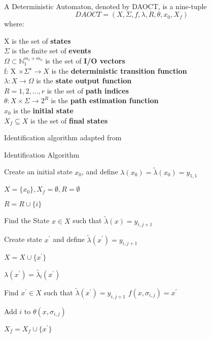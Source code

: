 \begin{definition}
  \label{def:daoct}~\\
  A Deterministic Automaton, denoted by DAOCT, is a nine-tuple
  \[ DAOCT = (X,\Sigma,f,\lambda,R,\theta, x_0,X_f)\] where:

  \indent X is the set of \textbf{states} \\
  \indent $\Sigma$ is the finite set of \textbf{events}\\
  \indent $\Omega \subset \mathbb{N}_1^{m_i+m_o} $ is the set of \textbf{I/O vectors}\\
  \indent f: X $\times \Sigma^\star \rightarrow X$ is the \textbf{deterministic transition function}  \\
  \indent $\lambda : X \rightarrow \Omega$ is the \textbf{state output function} \\
  \indent $R = {1,2,\dots,r}$ is the set of \textbf{path indices} \\
  \indent $\theta : X \times \Sigma \rightarrow 2^R$ is the \textbf{path
    estimation function} \\
  \indent $x_0$ is the \textbf{initial state} \\
  \indent $X_f \subseteq X $ is the set of \textbf{final states}
\end{definition}

Identification algorithm adapted from \cite{moreira2018enhanced}
\begin{algorithm2e}
  \caption{Identification Algorithm}\label{alg:identification}
    \BlankLine Create an initial state $x_0$, and define $\lambda(x_0) =
  \tilde{\lambda}(x_0) = y_{1,1}$

  $X = \{ x_0\}, X_f = \emptyset, R = \emptyset$

   { $R = R \cup \{ i \}$
  
     { Find the State $x \in X $ such that
      $\tilde{\lambda}(x) = y_{i,j+1}$

       { Create
        state $x^\prime$ and define $\tilde{\lambda}(x^\prime) = y_{i,j+1}$

        $X = X \cup \{ x^\prime\}$

        $\lambda(x^\prime) = \tilde{\lambda_l}(x^\prime)$

      } { Find $x^\prime \in X$ such that $\tilde{\lambda}(x^\prime) =
        y_{i,j+1}$ } $f(x,\sigma_{i,j}) = x^\prime$

      Add $i$ to $\theta(x,\sigma_{i,j})$

       { $X_f = X_f \cup \{x^\prime\}$ } } }
\end{algorithm2e}



